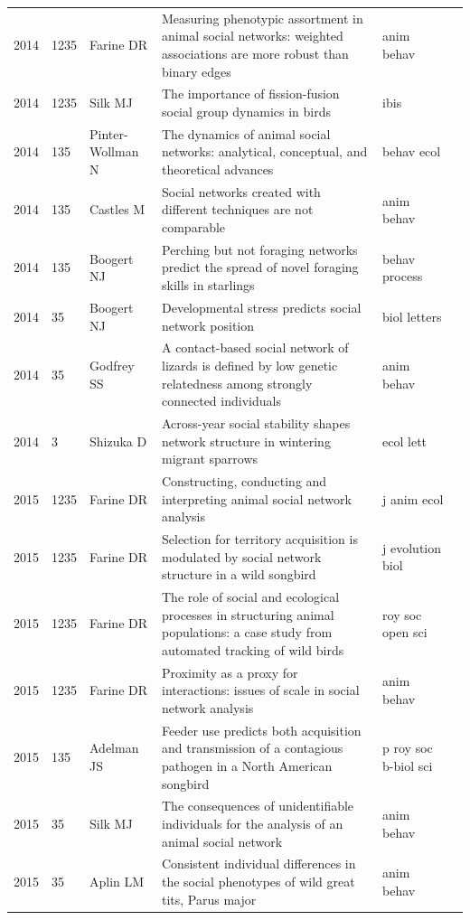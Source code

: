 \documentclass[11pt]{article} %
\begin{document}
\begin{landscape}
\begin{longtable}{p{0.7cm}|p{0.8cm}|p{3cm}|p{14.5cm}|p{3.5cm}l}
2014& 	1235& 	 Farine DR& 	 Measuring phenotypic assortment in animal social networks: weighted associations are more robust than binary edges& 	 anim behav\\
2014& 	1235& 	 Silk MJ& 	 The importance of fission-fusion social group dynamics in birds& 	 ibis\\
2014& 	135& 	 Pinter-Wollman N& 	 The dynamics of animal social networks: analytical, conceptual, and theoretical advances& 	 behav ecol\\
2014& 	135& 	 Castles M& 	 Social networks created with different techniques are not comparable& 	 anim behav\\
2014& 	135& 	 Boogert NJ& 	 Perching but not foraging networks predict the spread of novel foraging skills in starlings& 	 behav process\\
2014& 	35& 	 Boogert NJ& 	 Developmental stress predicts social network position& 	 biol letters\\
2014& 	35& 	 Godfrey SS& 	 A contact-based social network of lizards is defined by low genetic relatedness among strongly connected individuals& 	 anim behav\\
2014& 	3& 	 Shizuka D& 	 Across-year social stability shapes network structure in wintering migrant sparrows& 	 ecol lett\\
2015& 	1235& 	 Farine DR& 	 Constructing, conducting and interpreting animal social network analysis& 	 j anim ecol\\
2015& 	1235& 	 Farine DR& 	 Selection for territory acquisition is modulated by social network structure in a wild songbird& 	 j evolution biol\\
2015& 	1235& 	 Farine DR& 	 The role of social and ecological processes in structuring animal populations: a case study from automated tracking of wild birds& 	 roy soc open sci\\
2015& 	1235& 	 Farine DR& 	 Proximity as a proxy for interactions: issues of scale in social network analysis& 	 anim behav\\
2015& 	135& 	 Adelman JS& 	 Feeder use predicts both acquisition and transmission of a contagious pathogen in a North American songbird& 	 p roy soc b-biol sci\\
2015& 	35& 	 Silk MJ& 	 The consequences of unidentifiable individuals for the analysis of an animal social network& 	 anim behav\\
2015& 	35& 	 Aplin LM& 	 Consistent individual differences in the social phenotypes of wild great tits, Parus major& 	 anim behav\\

\end{longtable}
\end{landscape}
\end{document}
